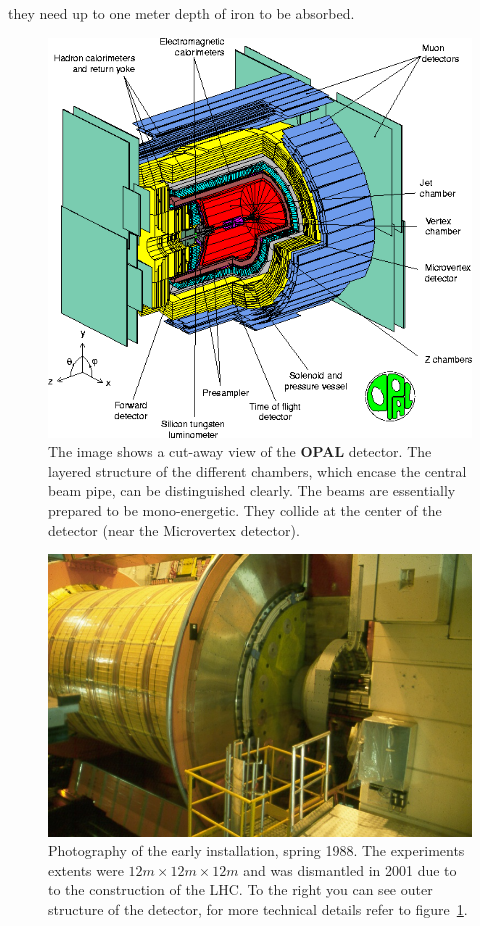 they need up to one meter depth of iron to be absorbed. 
\begin{figure}[htpb]
    \centering
    \includegraphics[width=1.0\linewidth]{figures/opal}
    \caption{The image shows a cut-away view of the \textbf{OPAL} detector\cite{CERN_OPAL}. The layered structure of the
    different chambers, which encase the central beam pipe, can be distinguished clearly. The beams are essentially
prepared to be mono-energetic. They collide at the center of the detector (near the Microvertex detector).}
    \label{fig:opal1}
\end{figure}

\begin{figure}[htpb]
    \centering
    \includegraphics[width=1.0\linewidth]{figures/opal_photo}
    \caption{Photography of the early installation, spring 1988\cite{CERN_OPAL}. The experiments extents were
    $12m \times 12m \times 12m$ and was dismantled in 2001 due to to the construction of the LHC. To the right you can 
see outer structure of the detector, for more technical details refer to figure~\ref{fig:opal1}. }
    \label{fig:opal_photo}
\end{figure}


